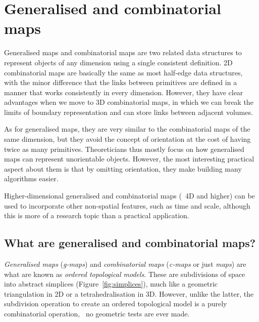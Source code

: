 
\setchapterpreamble[u]{\margintoc}

\graphicspath{{gmaps/}}

\chapter{Generalised and combinatorial maps}%
\label{chap:gmaps}

Generalised maps and combinatorial maps are two related data structures to represent objects of any dimension using a single consistent definition.
2D combinatorial maps are basically the same as most half-edge data structures, with the minor difference that the links between primitives are defined in a manner that works consistently in every dimension.
However, they have clear advantages when we move to 3D combinatorial maps, in which we can break the limits of boundary representation and can store links between adjacent volumes.

As for generalised maps, they are very similar to the combinatorial maps of the same dimension, but they avoid the concept of orientation at the cost of having twice as many primitives.
Theoreticians thus mostly focus on how generalised maps can represent unorientable objects.
However, the most interesting practical aspect about them is that by omitting orientation, they make building many algorithms easier.

Higher-dimensional generalised and combinatorial maps (\ie\ 4D and higher) can be used to incorporate other non-spatial features, such as time and scale, although this is more of a research topic than a practical application.

\section{What are generalised and combinatorial maps?}

\emph{Generalised maps} (\emph{g-maps}) and \emph{combinatorial maps} (\emph{c-maps} or just \emph{maps}) are what are known as \emph{ordered topological models}.
These are subdivisions of space into abstract simplices (Figure~\ref{fig:simplices}), much like a geometric triangulation in 2D or a tetrahedralisation in 3D.
However, unlike the latter, the subdivision operation to create an ordered topological model is a purely combinatorial operation, \ie\ no geometric tests are ever made.

